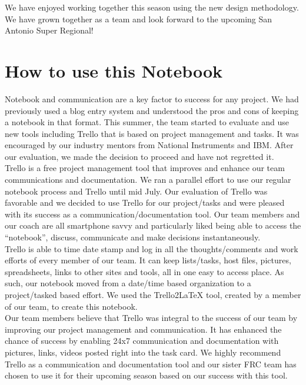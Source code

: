 We have enjoyed working together this season using the new design methodology. We have grown together as a team and look forward to the upcoming San Antonio Super Regional!\\

\newpage

\section{How to use this Notebook}
Notebook and communication are a key factor to success for any project. We had previously used a blog entry system and understood the pros and cons of keeping a notebook in that format.  This summer, the team started to evaluate and use new tools including Trello that is based on project management and tasks. It was encouraged by our industry mentors from National Instruments and IBM.  After our evaluation, we made the decision to proceed and have not regretted it.\\

Trello is a free project management tool that improves and enhance our team communications and documentation. We ran a parallel effort to use our regular notebook process and Trello until mid July. Our evaluation of Trello was favorable and we decided to use Trello for our project/tasks and were pleased with its success as a communication/documentation tool.  Our team members and our coach are all smartphone savvy and particularly liked being able to access the “notebook”, discuss, communicate and make decisions instantaneously.\\

Trello is able to time date stamp and log in all the thoughts/comments and work efforts of every member of our team. It can keep lists/tasks, host files, pictures, spreadsheets, links to other sites and tools, all in one easy to access place.  As such, our notebook moved from a date/time based organization to a project/tasked based effort.   We used the Trello2LaTeX tool, created by a member of our team, to create this notebook.\\

Our team members believe that Trello was integral to the success of our team by improving our project management and communication.  It has enhanced the chance of success by enabling 24x7 communication and documentation with pictures, links, videos posted right into the task card. We highly recommend Trello as a communication and documentation tool and our sister FRC team has chosen to use it for their upcoming season based on our success with this tool.\\

